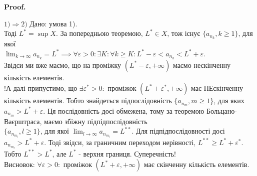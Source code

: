 \documentclass[a4paper, 14pt]{article}
\makeatletter
\def\qed{$\blacksquare$}
\theoremstyle{theoremdd}
\theoremstyle{theoremdd}
\theoremstyle{theoremdd}
\theoremstyle{theoremdd}
\theoremstyle{theoremdd}
\theoremstyle{theoremdd}
\theoremstyle{theoremdd}
\theoremstyle{theoremdd}
\renewenvironment{proof}[1][Proof.\\]{\par
\pushQED{\hfill \qed}%
\normalfont \topsep6\p@\@plus6\p@\relax
\trivlist
\item\relax
{\bfseries
#1\@addpunct{.}}\hspace\labelsep\ignorespaces
}{%
\popQED\endtrivlist\@endpefalse
}
\makeatother
\begin{document}
	\begin{proof}
	$\boxed{1) \Rightarrow 2)}$ Дано: умова 1).\\
	Тоді $L^* = \displaystyle \sup X$. За попередньою теоремою, $L^* \in X$, тож існує $\{a_{n_k}, k \geq 1\}$, для якої \\ $\displaystyle \lim_{k \to \infty} a_{n_k} = L^* \implies \forall \varepsilon > 0: \exists K: \forall k \geq K: L^*-\varepsilon < a_{n_k} < L^*+\varepsilon$.\\
	Звідси ми вже маємо, що на проміжку $(L^*-\varepsilon, +\infty)$ маємо нескінченну кількість елементів.\\
	!А далі припустимо, що $\exists \varepsilon^* > 0:$ проміжок $(L^*+\varepsilon^*, + \infty)$ має НЕскінченну кількість елементів. Тобто знайдеться підпослідовність $\{a_{n_m}, m \geq 1\}$, для яких $a_{n_m} > L^*+\varepsilon$. Ця послідовність досі обмежена, тому за теоремою Больцано-Ваєрштраса, маємо збіжну підпідпослідовність \\ $\{a_{n_{m_l}}, l \geq 1\}$, для якої $\displaystyle\lim_{l \to \infty} a_{n_{m_l}} = L^{**}$. Для підпідпослідовності досі $a_{n_{m_l}} > L^* + \varepsilon$. Тоді звідси, за граничним переходом нерівності, $L^{**} \geq L^* + \varepsilon^*$. Тобто $L^{**} > L^*$, але $L^*$ - верхня границя. Суперечність!\\
	Висновок: $\forall \varepsilon > 0:$ проміжок $(L^*+\varepsilon, + \infty)$ має скінченну кількість елементів.
	\bigskip \\
	

\end{proof}
\end{document}

